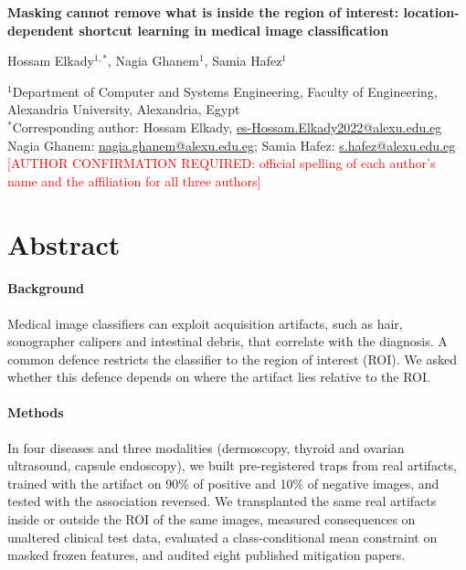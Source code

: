 \documentclass[12pt]{article}
\newcommand{\confirm}[1]{\textcolor{red}{[AUTHOR CONFIRMATION REQUIRED: #1]}}
\begin{document}
\begin{center}
{\Large\bfseries Masking cannot remove what is inside the region of interest: location-dependent shortcut learning
in medical image classification}\par\bigskip
Hossam Elkady$^{1,*}$, Nagia Ghanem$^{1}$, Samia Hafez$^{1}$\par\medskip
{\small $^1$Department of Computer and Systems Engineering, Faculty of Engineering, Alexandria University, Alexandria,
Egypt\\[2pt]
$^*$Corresponding author: Hossam Elkady, \href{mailto:es-Hossam.Elkady2022@alexu.edu.eg}{es-Hossam.Elkady2022@alexu.edu.eg}\\[2pt]
Nagia Ghanem: \href{mailto:nagia.ghanem@alexu.edu.eg}{nagia.ghanem@alexu.edu.eg}; Samia Hafez:
\href{mailto:s.hafez@alexu.edu.eg}{s.hafez@alexu.edu.eg}\\[2pt]
\confirm{official spelling of each author's name and the affiliation for all three authors}}
\end{center}

\section*{Abstract}
\paragraph{Background} Medical image classifiers can exploit acquisition artifacts, such as hair, sonographer calipers
and intestinal debris, that correlate with the diagnosis. A common defence restricts the classifier to the region of
interest (ROI). We asked whether this defence depends on where the artifact lies relative to the ROI.

\paragraph{Methods} In four diseases and three modalities (dermoscopy, thyroid and ovarian ultrasound, capsule
endoscopy), we built pre-registered traps from real artifacts, trained with the artifact on 90\% of positive and 10\% of
negative images, and tested with the association reversed. We transplanted the same real artifacts inside or outside the
ROI of the same images, measured consequences on unaltered clinical test data, evaluated a class-conditional mean
constraint on masked frozen features, and audited eight published mitigation papers.
\end{document}
